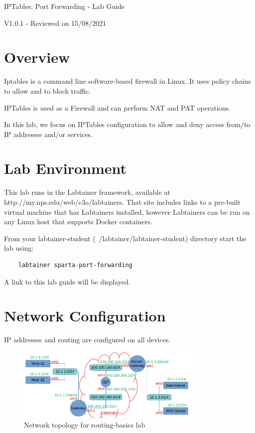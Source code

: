 


\begin{center}
{\LARGE IPTables: Port Forwarding - Lab Guide}

V1.0.1 - Reviewed on 15/08/2021
\vspace{0.1in}\\
\end{center}

\copyrightnotice

\section{Overview}
Iptables is a command line software-based firewall in Linux. It uses policy chains to allow and to block traffic.

IPTables is used as a Firewall and can perform NAT and PAT operations.

In this lab, we focus on IPTables configuration to allow and deny access from/to IP addresses and/or services.

\section{Lab Environment}
This lab runs in the Labtainer framework,
available at http://my.nps.edu/web/c3o/labtainers.
That site includes links to a pre-built virtual machine
that has Labtainers installed, however Labtainers can
be run on any Linux host that supports Docker containers.

From your labtainer-student (~/labtainer/labtainer-student) directory start the lab using:
\begin{verbatim}
    labtainer sparta-port-forwarding
\end{verbatim}
\noindent A link to this lab guide will be displayed.

\section{Network Configuration}
IP addresses and routing are configured on all devices.

\begin{figure}[H]
\begin{center}
\includegraphics [width=0.8\textwidth]{labtainers-port-forwarding-lab-01.png}
\end{center}
\caption{Network topology for routing-basics lab}
\label{fig:topology}
\end{figure}

